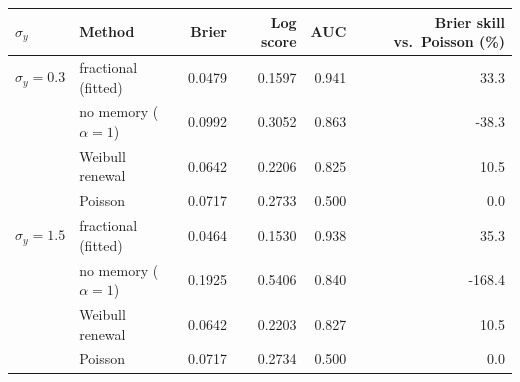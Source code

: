 \begin{tabular}{llrrrr}
\toprule
$\sigma_y$ & Method & Brier & Log score & AUC & Brier skill vs.\ Poisson (\%)\\
\midrule
$\sigma_y=0.3$ & fractional (fitted) & 0.0479 & 0.1597 & 0.941 & 33.3\\
 & no memory ($\alpha=1$) & 0.0992 & 0.3052 & 0.863 & -38.3\\
 & Weibull renewal & 0.0642 & 0.2206 & 0.825 & 10.5\\
 & Poisson & 0.0717 & 0.2733 & 0.500 & 0.0\\
\midrule
$\sigma_y=1.5$ & fractional (fitted) & 0.0464 & 0.1530 & 0.938 & 35.3\\
 & no memory ($\alpha=1$) & 0.1925 & 0.5406 & 0.840 & -168.4\\
 & Weibull renewal & 0.0642 & 0.2203 & 0.827 & 10.5\\
 & Poisson & 0.0717 & 0.2734 & 0.500 & 0.0\\
\bottomrule
\end{tabular}

